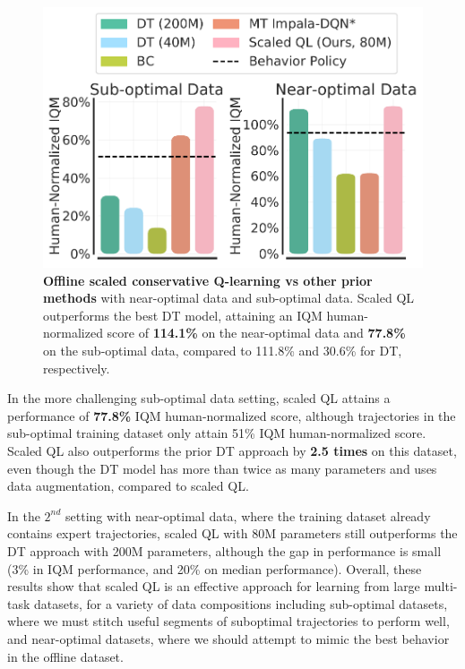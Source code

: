 \begin{figure}
    \vspace{-0.5cm}
    \centering
    \includegraphics[width=0.95\linewidth]{chapters/scaled_ql/combnined_data_results_iqm.pdf}
    \vspace{-0.25cm}
    \caption{\footnotesize{\textbf{Offline scaled conservative Q-learning vs other prior methods} with near-optimal data and sub-optimal data. Scaled QL outperforms the best DT model, attaining an IQM human-normalized score of \textbf{114.1\%} on the near-optimal data and \textbf{77.8\%} on the sub-optimal data, compared to 111.8\% and 30.6\% for DT, respectively.}}
    \label{fig:main_results}
    \vspace{-0.5cm}
\end{figure}

In the more challenging sub-optimal data setting, scaled QL attains a performance of \textbf{77.8\%} IQM human-normalized score, although trajectories in the sub-optimal training dataset only attain 51\% IQM human-normalized score. Scaled QL also outperforms the prior DT approach by \textbf{2.5 times} on this dataset, even though the DT model has more than twice as many parameters and uses data augmentation, compared to scaled QL. 

In the $2^{nd}$ setting with near-optimal data, where the training dataset already contains expert trajectories, scaled QL with 80M parameters still outperforms the DT approach with 200M parameters, although the gap in performance is small (3\% in IQM performance, and 20\% on median performance). 
Overall, these results show that scaled QL is an effective approach for learning from large multi-task datasets, for a variety of data compositions including sub-optimal datasets, where we must stitch useful segments of suboptimal trajectories to perform well, and near-optimal datasets, where we should attempt to mimic the best behavior in the offline dataset. 

